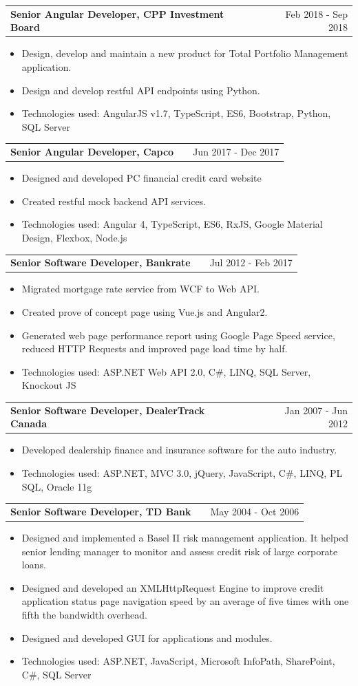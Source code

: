 \documentclass[a4paper,12pt]{article}
\makeatletter
\newenvironment{joblong}[2]
    {
    \begin{tabularx}{\linewidth}{@{}l X r@{}}
    \textbf{#1} & \hfill &  #2 \\[3.75pt]
    \end{tabularx}
    \begin{minipage}[t]{\linewidth}
    \begin{itemize}[nosep,after=\strut, leftmargin=1em, itemsep=3pt,label=--]
    }
    {
    \end{itemize}
    \end{minipage}    
    }
\makeatother
\begin{document}
\begin{joblong}{Senior Angular Developer, CPP Investment Board}{Feb 2018 - Sep 2018}
\item Design, develop and maintain a new product for Total Portfolio Management application.
\item Design and develop restful API endpoints using Python. 
\item Technologies used: AngularJS v1.7, TypeScript, ES6, Bootstrap, Python, SQL Server
\end{joblong}

\begin{joblong}{Senior Angular Developer, Capco}{Jun 2017 - Dec 2017}
\item Designed and developed PC financial credit card website 
\item Created restful mock backend API services. 
\item Technologies used: Angular 4, TypeScript, ES6, RxJS, Google Material Design, Flexbox, Node.js
\end{joblong}

\begin{joblong}{Senior Software Developer, Bankrate}{Jul 2012 - Feb 2017}
\item Migrated mortgage rate service from WCF to Web API.
\item Created prove of concept page using Vue.js and Angular2. 
\item Generated web page performance report using Google Page Speed service, reduced HTTP Requests and improved page load time by half.
\item Technologies used: ASP.NET Web API 2.0, C\#, LINQ, SQL Server, Knockout JS
\end{joblong}

\begin{joblong}{Senior Software Developer, DealerTrack Canada}{Jan 2007 - Jun 2012}
\item Developed dealership finance and insurance software for the auto industry.
\item Technologies used: ASP.NET, MVC 3.0, jQuery, JavaScript, C\#, LINQ, PL SQL, Oracle 11g
\end{joblong}

\begin{joblong}{Senior Software Developer, TD Bank}{May 2004 - Oct 2006}
\item Designed and implemented a Basel II risk management application. It helped senior lending manager to monitor and assess credit risk of large corporate loans.
\item Designed and developed an XMLHttpRequest Engine to improve credit application status page navigation speed by an average of five times with one fifth the bandwidth overhead. 
\item Designed and developed GUI for applications and modules.
\item Technologies used: ASP.NET, JavaScript, Microsoft InfoPath, SharePoint, C\#, SQL Server
\end{joblong}
\end{document}
